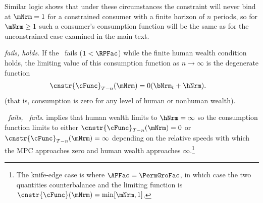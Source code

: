 \documentclass[\econtexRoot/BufferStockTheory]{subfiles}
\begin{document}
Similar logic shows that under these circumstances the constraint will never bind at $\mNrm=1$ for a constrained consumer with a finite horizon of $n$ periods, so for $\mNrm \geq 1$ such a consumer's consumption function will be the same as for the unconstrained case examined in the main text.

\hypertarget{cnclGICRawcnclRICFHWC}{}

\textit{{\RIC} fails, {\FHWC} holds.} If the \RIC~fails ($1 < \RPFac$) while the finite human wealth condition
holds, the limiting value of this consumption function as $n \rightarrow
\infty$ is the degenerate function
\begin{equation}\begin{gathered}\begin{aligned}
  \cnstr{\cFunc}_{T-n}(\mNrm)  & = 0 (\bNrm_{t}+\hNrm).
\end{aligned}\end{gathered}\end{equation}
(that is, consumption is zero for any level of human or nonhuman wealth).

\hypertarget{cnclGICRawcnclRICcnclFHWC}{}

\textit{{\RIC}~fails, {\FHWC}~fails}.
{\cncl{\FHWC}} implies that human wealth limits to $\hNrm =
\infty$ so the consumption function limits to either
$\cnstr{\cFunc}_{T-n}(\mNrm) = 0$ or
$\cnstr{\cFunc}_{T-n}(\mNrm) = \infty$ depending on the relative
speeds with which the MPC approaches zero and human wealth approaches
$\infty$.\footnote{The knife-edge case is where $\APFac = \PermGroFac$, in
  which case the two quantities counterbalance and the limiting
  function is $\cnstr{\cFunc}(\mNrm)=\min[\mNrm,1]$.}

\let\TableWidth\relax
{\newlength\TableWidth}
\end{document}
